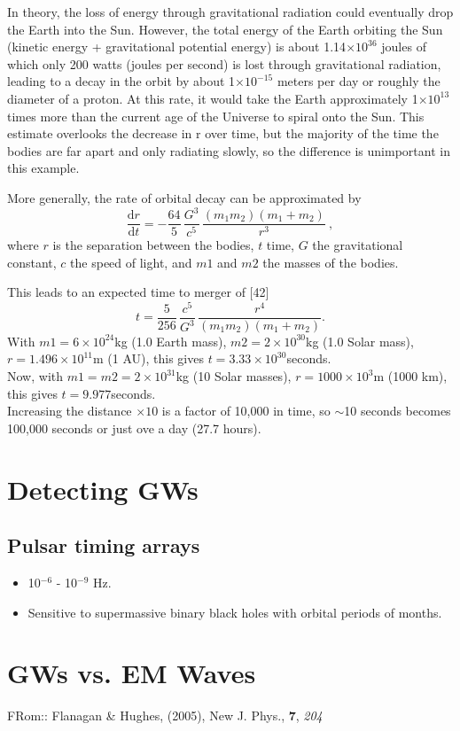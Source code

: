 \documentclass[11pt,a4paper]{article}
\begin{document}
In theory, the loss of energy through gravitational radiation could
eventually drop the Earth into the Sun. However, the total energy of
the Earth orbiting the Sun (kinetic energy + gravitational potential
energy) is about 1.14$\times10^{36}$ joules of which only 200 watts (joules per
second) is lost through gravitational radiation, leading to a decay in
the orbit by about 1$\times10^{-15}$ meters per day or roughly the diameter of a
proton. At this rate, it would take the Earth approximately 1$\times10^{13}$ 
times more than the current age of the Universe to spiral onto the
Sun. This estimate overlooks the decrease in r over time, but the
majority of the time the bodies are far apart and only radiating
slowly, so the difference is unimportant in this example. 

More generally, the rate of orbital decay can be approximated by
\begin{equation}
{\frac {\mathrm {d} r}{\mathrm {d} t}}=-{\frac {64}{5}}\,{\frac {G^{3}}{c^{5}}}\,{\frac {(m_{1}m_{2})(m_{1}+m_{2})}{r^{3}}}\ , 
\end{equation}
where $r$ is the separation between the bodies, $t$ time, $G$ the gravitational constant, $c$ the speed of light, and $m1$ and $m2$ the masses of the bodies. 

This leads to an expected time to merger of [42] 
\begin{equation}
t={\frac {5}{256}}\,{\frac {c^{5}}{G^{3}}}\,{\frac {r^{4}}{(m_{1}m_{2})(m_{1}+m_{2})}}.
\end{equation}
With 
$m1=6 \times 10^{24}$kg (1.0 Earth mass), 
$m2=2 \times 10^{30}$kg (1.0 Solar mass), 
$r=1.496 \times 10^{11}$m (1 AU), this gives $t=3.33 \times 10^{30}$seconds. \\

Now, with 
$m1=m2=2 \times 10^{31}$kg (10 Solar masses), 
$r= 1000 \times 10^{3}$m (1000 km), this gives $t=9.977$seconds. \\

Increasing the distance $\times10$ is a factor of 10,000 in time, 
so $\sim$10 seconds becomes 100,000 seconds or just ove a day
(27.7 hours). \\


\newpage
\section{Detecting GWs}

\subsection{Pulsar timing arrays }
\begin{itemize}
\item  10$^{-6}$ - 10$^{-9}$ Hz. 
\item  Sensitive to supermassive binary black holes with orbital periods of months. 
\end{itemize}


\newpage
\section{GWs vs. EM Waves}
FRom:: Flanagan \& Hughes, (2005), New J. Phys., {\bf 7}, {\it 204}\\
\end{document}
